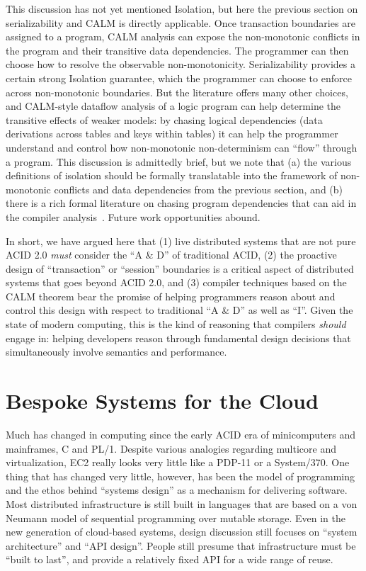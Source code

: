 \documentclass{sig-alternate}
\begin{document}
This discussion has not yet mentioned Isolation, but here the previous section
on serializability and CALM is directly applicable. Once transaction boundaries
are assigned to a program, CALM analysis can expose the non-monotonic conflicts
in the program and their transitive data dependencies.  The programmer can then
choose how to resolve the observable non-monotonicity.  Serializability provides
a certain strong Isolation guarantee, which the programmer can choose to enforce
across non-monotonic boundaries.  But the literature offers many other choices,
and CALM-style dataflow analysis of a logic program can help determine the
transitive effects of weaker models: by chasing logical dependencies (data
derivations across tables and keys within tables) it can help the programmer
understand and control how non-monotonic non-determinism can ``flow'' through a
program.  This discussion is admittedly brief, but we note that (a) the various
definitions of isolation should be formally translatable into the framework of
non-monotonic conflicts and data dependencies from the previous section, and (b)
there is a rich formal literature on chasing program dependencies that can aid
in the compiler analysis~\cite{alicebook}.  Future work opportunities abound.

In short, we have argued here that (1) live distributed systems that are not pure ACID 2.0 \emph{must} consider the ``A \& D'' of traditional ACID, (2) the proactive design of ``transaction'' or ``session'' boundaries is a critical aspect of distributed systems that goes beyond ACID 2.0, and (3) compiler techniques based on the CALM theorem bear the promise of helping programmers reason about and control this design with respect to traditional ``A \& D'' as well as ``I''.  Given the state of modern computing, this is the kind of reasoning that compilers \emph{should} engage in: helping developers reason through fundamental design decisions that simultaneously involve semantics and performance.  

\section{Bespoke Systems for the Cloud}
Much has changed in computing since the early ACID era of minicomputers and mainframes, C and PL/1.  Despite various analogies regarding multicore and virtualization, EC2 really looks very little like a PDP-11 or a System/370.  One thing that has changed very little, however, has been the model of programming and the ethos behind ``systems design'' as a mechanism for delivering software.  Most distributed infrastructure is still built in languages that are based on a von Neumann model of sequential programming over mutable storage.  Even in the new generation of cloud-based systems, design discussion still focuses on ``system architecture'' and ``API design''.  People still presume that infrastructure must be ``built to last'', and provide a relatively fixed API for a wide range of reuse.  
\end{document}
